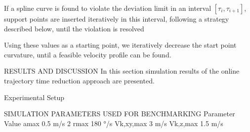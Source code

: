 \documentclass[a4paper]{report}
\begin{document}
If a spline curve is found to
violate the deviation limit in an interval $[\tau_i
, \tau_{i+1}]$, support
points are inserted iteratively in this interval, following a
strategy described below, until the violation is resolved

Using these values as a starting point, we
iteratively decrease the start point curvature, until a feasible
velocity profile can be found.

RESULTS AND DISCUSSION
In this section simulation results of the online trajectory
time reduction approach are presented.

Experimental Setup

SIMULATION PARAMETERS USED FOR BENCHMARKING
Parameter Value
amax 0.5 m/s
2
rmax 180 °/s
Vk,xy,max 3 m/s
Vk,z,max 1.5 m/s
\end{document}
